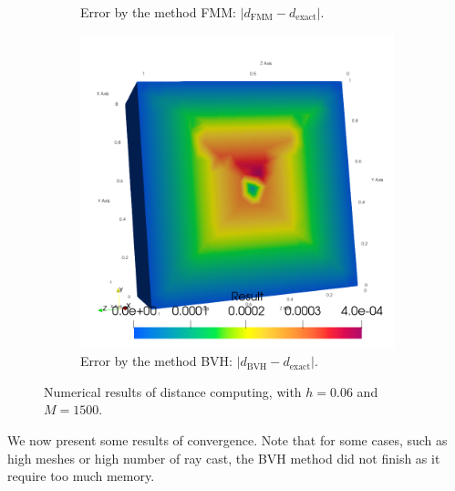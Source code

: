 \begin{figure}
\begin{subfigure}{0.33\textwidth}
        \caption{Error by the method FMM: $|d_\mathrm{FMM}-d_\mathrm{exact}|$.}
        \label{fig:specs:app-feelpp-distance:results:error-fmm}
    \end{subfigure}
    \begin{subfigure}{0.33\textwidth}
        \centering
        \includegraphics[width=\columnwidth]{graphics/feelpp/feelpp-benchmark-distance-errorBVH}
        \caption{Error by the method BVH: $|d_\mathrm{BVH}-d_\mathrm{exact}|$.}
        \label{fig:specs:app-feelpp-distance:results:error-bvh}
    \end{subfigure}
    \caption{Numerical results of distance computing, with $h=0.06$ and $M=1500$.}
    \label{fig:specs:app-feelpp-distance:results}
\end{figure}

We now present some results of convergence.
Note that for some cases, such as high meshes or high number of ray cast, the BVH method did not finish as it require too much memory.


\dataTimeBVHnp
{}\dataSpeedupBVHnp
{}\dataTimeFMMnp
{}\dataSpeedupFMMnp
{}\dataTimeBVHM
{}\dataConvBVH
{}\dataConvFMM


